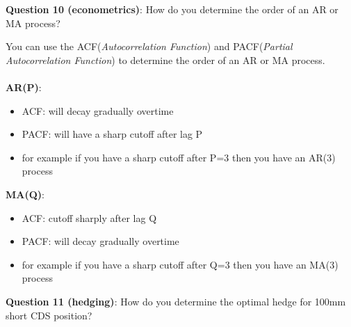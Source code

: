 \documentclass[a4paper,10pt]{article}
\begin{document}
\vspace{0.5cm}
\noindent
\textbf{Question 10 (econometrics)}:  How do you determine the order of an AR or MA process?
\vspace{0.25cm}
\noindent
\begin{sloppypar}
    \noindent
    You can use the ACF(\textit{Autocorrelation Function}) and PACF(\textit{Partial Autocorrelation Function}) to determine the order of an AR or MA process.\\ 
    \\
    \textbf{AR(P)}:
        \indent
        \begin{itemize}
            \item{ACF}: will decay gradually overtime
            \item{PACF}: will have a sharp cutoff after lag P
            \item for example if you have a sharp cutoff after P=3 then you have an AR(3) process
        \end{itemize}
    \textbf{MA(Q)}:
        \indent
        \begin{itemize}
            \item{ACF}: cutoff sharply after lag Q
            \item {PACF}: will decay gradually overtime
            \item for example if you have a sharp cutoff after Q=3 then you have an MA(3) process
        \end{itemize}
    
\end{sloppypar}
\vspace{0.5cm}
\noindent
\textbf{Question 11 (hedging)}: How do you determine the optimal hedge for 100mm short CDS position?
\vspace{0.25cm}
\noindent
\end{document}
